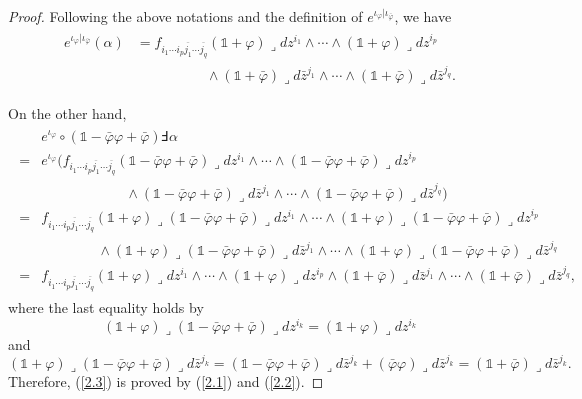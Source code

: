\documentclass[12pt]{amsart}
\numberwithin{equation}{section}
\renewcommand{\1}{\mathds{1}}
\renewcommand{\>}{\rightarrow}
\def\o{\overline}
\def\b{\bar}
\def\l{\lrcorner}
\begin{document}
\begin{proof}
Following the above notations and the definition of
$e^{\iota_{\varphi}|\iota_{\b{\varphi}}}$, we have
\begin{align}\label{2.1}
\begin{split}
  e^{\iota_{\varphi}|\iota_{\b{\varphi}}}(\alpha)&=f_{i_1\cdots i_p\o{j_1}\cdots\o{j_q}}(\1+\varphi)\l dz^{i_1}\wedge \cdots\wedge (\1+\varphi)\l dz^{i_p}\\
  &\qquad\qquad\quad\wedge (\1+\b{\varphi})\l d\b{z}^{j_1}\wedge \cdots\wedge (\1+\b{\varphi})\l d\b{z}^{j_q}.
  \end{split}
\end{align}

On the other hand,
\begin{align}\label{2.2}
  \begin{split}
    &e^{\iota_{\varphi}}\circ(\1-\b{\varphi}\varphi+\b{\varphi})\Finv\alpha\\
    =&e^{\iota_{\varphi}}\Big(f_{i_1\cdots i_p\o{j_1}\cdots\o{j_q}}(\1-\b{\varphi}\varphi+\b{\varphi})\l dz^{i_1}\wedge \cdots\wedge (\1-\b{\varphi}\varphi+\b{\varphi})\l dz^{i_p}\\
  &\qquad\qquad\qquad\wedge (\1-\b{\varphi}\varphi+\b{\varphi})\l d\b{z}^{j_1}\wedge \cdots\wedge (\1-\b{\varphi}\varphi+\b{\varphi})\l d\b{z}^{j_q}\Big)\\
  =&f_{i_1\cdots i_p\o{j_1}\cdots\o{j_q}}(\1+\varphi)\l(\1-\b{\varphi}\varphi+\b{\varphi})\l dz^{i_1}\wedge \cdots\wedge (\1+\varphi)\l(\1-\b{\varphi}\varphi+\b{\varphi})\l dz^{i_p}\\
  &\qquad\quad\quad\wedge (\1+\varphi)\l(\1-\b{\varphi}\varphi+\b{\varphi})\l d\b{z}^{j_1}\wedge \cdots\wedge (\1+\varphi)\l(\1-\b{\varphi}\varphi+\b{\varphi})\l d\b{z}^{j_q}\\
  =&f_{i_1\cdots i_p\o{j_1}\cdots\o{j_q}}(\1+\varphi)\l dz^{i_1}\wedge \cdots\wedge (\1+\varphi)\l dz^{i_p}\wedge (\1+\b{\varphi})\l d\b{z}^{j_1}\wedge \cdots\wedge (\1+\b{\varphi})\l d\b{z}^{j_q},
  \end{split}
\end{align}
where the last equality holds by
$$(\1+\varphi)\l(\1-\b{\varphi}\varphi+\b{\varphi})\l dz^{i_k}=(\1+\varphi)\l dz^{i_k}$$
and
$$(\1+\varphi)\l(\1-\b{\varphi}\varphi+\b{\varphi})\l d\b{z}^{j_k}=(\1-\b{\varphi}\varphi+\b{\varphi})\l d\b{z}^{j_k}+(\b{\varphi}\varphi)\l d\b{z}^{j_k}=(\1+\b{\varphi})\l d\b{z}^{j_k}.$$
Therefore, (\ref{2.3}) is proved by (\ref{2.1}) and (\ref{2.2}).
\end{proof}
\end{document}
